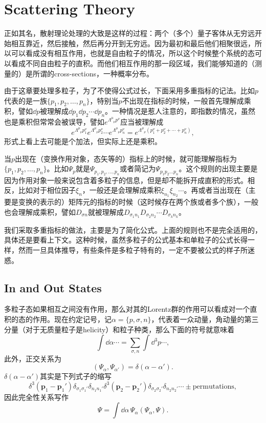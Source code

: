 \documentclass[9pt]{extbook}
\begin{document}
\chapter{Scattering Theory}

正如其名，散射理论处理的大致是这样的过程：两个（多个）量子客体从无穷远开始相互靠近，然后接触，然后再分开到无穷远。因为最初和最后他们相聚很远，所以可以看成没有相互作用，也就是自由粒子的情况，所以这个时候整个系统的态可以看成不同自由粒子的直积。而他们相互作用的那一段区域，我们能够知道的（测量的）是所谓的cross-sections，一种概率分布。

由于这章要处理多粒子，为了不使得公式过长，下面采用多重指标的记法。比如$p$代表的是一族$\{p_1,p_2,\dots,p_n\}$，特别当$p$不出现在指标的时候，一般首先理解成乘积，譬如$\dd p$被理解成$\dd p_1\dd p_2\cdots \dd p_n$。一种情况是惹人注意的，即指数的情况，虽然也是乘积但常常会被误导，譬如$e^{\Lambda^\mu_{\phantom{\mu}\nu}p^\nu}$应当被理解成
\[e^{\Lambda^\mu_{\phantom{\mu}\nu}p_1^\nu}e^{\Lambda^\mu_{\phantom{\mu}\nu}p_2^\nu}\cdots e^{\Lambda^\mu_{\phantom{\mu}\nu}p_n^\nu}=e^{\Lambda^\mu_{\phantom{\mu}\nu}(p_1^\nu+p_2^\nu+\cdots+p_n^\nu)},\]
形式上看上去可能是个加法，但实际上还是乘积。

当$p$出现在（变换作用对象，态矢等的）指标上的时候，就可能理解指标为$\{p_1,p_2,\dots,p_n\}$。比如$\Psi_p$就是$\Psi_{p_1,p_2,\dots,p_n}$或者简记为$\Psi_{p_1p_2\dots p_n}$。这个规则的出现主要是因为作用对象一般来说包含着多粒子的信息，但是却不能拆开成直积的形式。相反，比如对于相位因子$\xi_n$，一般还是会理解成乘积$\xi_{n_1}\xi_{n_2}\cdots$。再或者当出现在（主要是变换的表示的）矩阵元的指标的时候（这时候存在两个族或者多个族），一般也会理解成乘积，譬如$D_{\sigma n}$就被理解成$D_{\sigma_1 n_1}D_{\sigma_2 n_2}\cdots D_{\sigma_k n_k}$。

我们采取多重指标的做法，主要是为了简化公式。上面的规则也不是完全适用的，具体还是要看上下文。这种时候，虽然多粒子的公式基本和单粒子的公式长得一样，然而一旦具体推导，有些条件是多粒子特有的，一定不要被公式的样子所迷惑。

\section{In and Out States}
多粒子态如果相互之间没有作用，那么对其的Lorentz群的作用可以看成对一个直积的态的作用。现在约定记号，记$\alpha=\{p,\sigma,n\}$，代表着一众动量，角动量的第三分量（对于无质量粒子是helicity）和粒子种类，那么下面的符号就意味着
\[\int \dd \alpha \cdots=\sum_{\sigma,n}\int \dd^3 p\cdots,\]
此外，正交关系为
\[
(\Psi_\alpha,\Psi_{\alpha'})=\delta(\alpha-\alpha').
\]
$\delta(\alpha-\alpha')$其实是下列式子的缩写
\[
\delta^3(\bm{p}_1-\bm{p}_1')\delta_{\sigma_1 \sigma_1'}\delta_{n_1 n_1'}
\delta^3(\bm{p}_2-\bm{p}_2')\delta_{\sigma_2 \sigma_2'}\delta_{n_2 n_2'}
\cdots\pm \text{permutations},
\]
因此完全性关系写作
\[
\Psi=\int \dd \alpha\,\Psi_{\alpha}(\Psi_\alpha,\Psi).
\]
\end{document}
